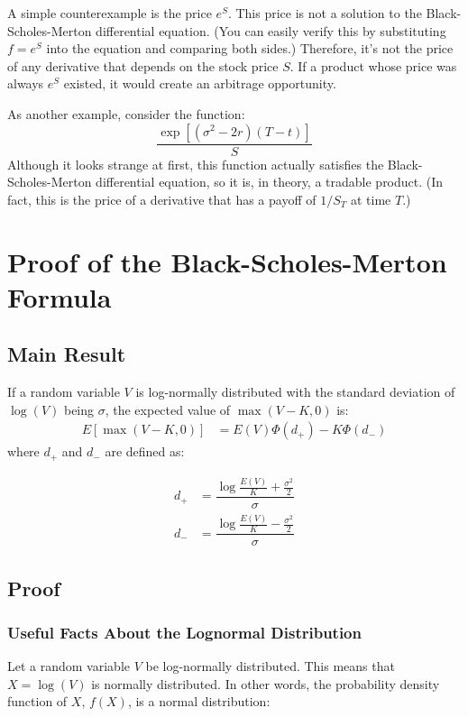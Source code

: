 \documentclass[uplatex]{jsarticle}
\begin{document}
A simple counterexample is the price $e^{S}$. This price is not a solution to the Black-Scholes-Merton differential equation. (You can easily verify this by substituting $f = e^{S}$ into the equation and comparing both sides.) Therefore, it's not the price of any derivative that depends on the stock price $S$. If a product whose price was always $e^{S}$ existed, it would create an arbitrage opportunity.

As another example, consider the function:
$$
	\dfrac{\exp{[(\sigma^{2} - 2r)(T-t)]}}{S}
$$
Although it looks strange at first, this function actually satisfies the Black-Scholes-Merton differential equation, so it is, in theory, a tradable product. (In fact, this is the price of a derivative that has a payoff of $1/S_{T}$ at time $T$.)

\section{Proof of the Black-Scholes-Merton Formula}

\subsection{Main Result}

If a random variable $V$ is log-normally distributed with the standard deviation of $\log(V)$ being $\sigma$, the expected value of $\max(V-K,0)$ is:
\begin{align}
	E \left[ \max(V-K,0) \right] & = E(V) \Phi (d_{+}) - K \Phi (d_{-})
\end{align}
where $d_{+}$ and $d_{-}$ are defined as:

\begin{align}
	d_{+} & = \dfrac{ \log \frac{E(V)}{K} + \frac{\sigma^{2}}{2} }{ \sigma } \\
	d_{-} & = \dfrac{ \log \frac{E(V)}{K} - \frac{\sigma^{2}}{2} }{ \sigma }
\end{align}


\subsection{Proof}

\subsubsection{Useful Facts About the Lognormal Distribution}

Let a random variable $V$ be log-normally distributed. This means that $X = \log(V)$ is normally distributed. In other words, the probability density function of $X$, $f(X)$, is a normal distribution:
\end{document}
